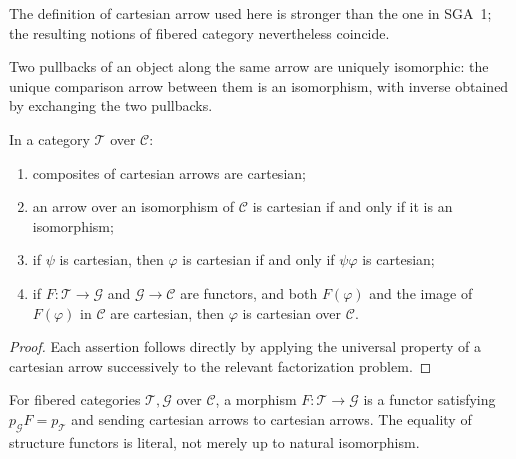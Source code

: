 \begin{remark}\label{fga-rem-3-2}\uses{}
The definition of cartesian arrow used here is stronger than the one in SGA~1;
the resulting notions of fibered category nevertheless coincide.
\end{remark}

\begin{remark}\label{fga-rem-3-3}\uses{}
Two pullbacks of an object along the same arrow are uniquely isomorphic: the
unique comparison arrow between them is an isomorphism, with inverse obtained
by exchanging the two pullbacks.
\end{remark}

\begin{proposition}\label{fga-pro-3-4}\uses{}
In a category $\mathcal T$ over $\mathcal C$:
\begin{enumerate}
\item composites of cartesian arrows are cartesian;
\item an arrow over an isomorphism of $\mathcal C$ is cartesian if and only if
it is an isomorphism;
\item if $\psi$ is cartesian, then $\varphi$ is cartesian if and only if
$\psi\varphi$ is cartesian;
\item if $F:\mathcal T\to\mathcal G$ and $\mathcal G\to\mathcal C$ are
functors, and both $F(\varphi)$ and the image of $F(\varphi)$ in $\mathcal C$
are cartesian, then $\varphi$ is cartesian over $\mathcal C$.
\end{enumerate}
\end{proposition}
\begin{proof}
Each assertion follows directly by applying the universal property of a
cartesian arrow successively to the relevant factorization problem.
\end{proof}

\begin{definition}\label{fga-def-3-6}\uses{}
For fibered categories $\mathcal T,\mathcal G$ over $\mathcal C$, a morphism
$F:\mathcal T\to\mathcal G$ is a functor satisfying $p_{\mathcal G}F=p_{\mathcal T}$
and sending cartesian arrows to cartesian arrows.  The equality of structure
functors is literal, not merely up to natural isomorphism.
\end{definition}

